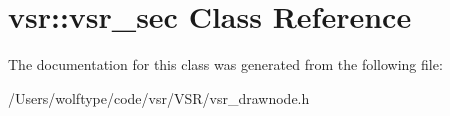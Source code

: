\hypertarget{classvsr_1_1vsr__sec}{\section{vsr\-:\-:vsr\-\_\-sec Class Reference}
\label{classvsr_1_1vsr__sec}
}


The documentation for this class was generated from the following file\-:\begin{DoxyCompactItemize}
\item 
/\-Users/wolftype/code/vsr/\-V\-S\-R/vsr\-\_\-drawnode.\-h\end{DoxyCompactItemize}
